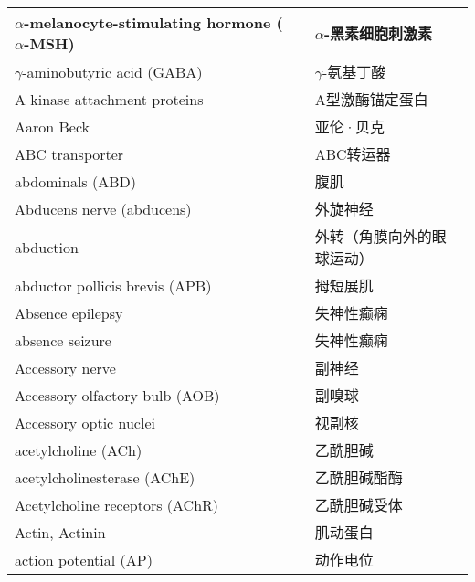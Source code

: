 \begin{longtable}{lll}
 	\midrule
 	$\alpha$-melanocyte-stimulating hormone ($\alpha$-MSH)    && $\alpha$-黑素细胞刺激素   \\
 	
 	\midrule
 	$\gamma$-aminobutyric acid (GABA)    && $\gamma$-氨基丁酸   \\
 	
 	\midrule
 	A kinase attachment proteins     && A型激酶锚定蛋白   \\
 	
 	\midrule
 	Aaron Beck     && 亚伦·贝克   \\
 	
 	\midrule
 	ABC transporter     && ABC转运器   \\
 	
 	\midrule
 	abdominals (ABD)     && 腹肌   \\
 
 	\midrule
 	Abducens nerve (abducens)     && 外旋神经   \\
 
 	\midrule
 	abduction     && 外转（角膜向外的眼球运动）   \\
 	
 	\midrule
 	abductor pollicis brevis (APB)     && 拇短展肌   \\
 	
 	\midrule
 	Absence epilepsy     && 失神性癫痫   \\
 	
 	\midrule
 	absence seizure     && 失神性癫痫   \\
 	
 	\midrule
 	Accessory nerve   &&  副神经   \\
 	
 	\midrule
 	Accessory olfactory bulb  (AOB) &&  副嗅球   \\
 	
 	\midrule
 	Accessory optic nuclei   && 视副核   \\
 
	\midrule
	acetylcholine (ACh)     && 乙酰胆碱   \\
	
	\midrule
	acetylcholinesterase (AChE)     && 乙酰胆碱酯酶   \\
	
	\midrule
	Acetylcholine receptors (AChR)    && 乙酰胆碱受体   \\
	
	\midrule
	Actin, Actinin  && 肌动蛋白	   \\
	
	\midrule
	action potential  (AP)  && 动作电位   \\
	

\end{longtable}
